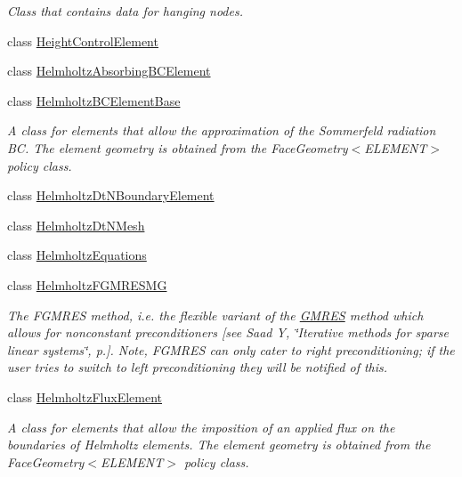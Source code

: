 \begin{DoxyCompactItemize}
\begin{DoxyCompactList}\small\item\em Class that contains data for hanging nodes. \end{DoxyCompactList}\item 
class \hyperlink{classoomph_1_1HeightControlElement}{Height\+Control\+Element}
\item 
class \hyperlink{classoomph_1_1HelmholtzAbsorbingBCElement}{Helmholtz\+Absorbing\+B\+C\+Element}
\item 
class \hyperlink{classoomph_1_1HelmholtzBCElementBase}{Helmholtz\+B\+C\+Element\+Base}
\begin{DoxyCompactList}\small\item\em A class for elements that allow the approximation of the Sommerfeld radiation BC. The element geometry is obtained from the Face\+Geometry$<$\+E\+L\+E\+M\+E\+N\+T$>$ policy class. \end{DoxyCompactList}\item 
class \hyperlink{classoomph_1_1HelmholtzDtNBoundaryElement}{Helmholtz\+Dt\+N\+Boundary\+Element}
\item 
class \hyperlink{classoomph_1_1HelmholtzDtNMesh}{Helmholtz\+Dt\+N\+Mesh}
\item 
class \hyperlink{classoomph_1_1HelmholtzEquations}{Helmholtz\+Equations}
\item 
class \hyperlink{classoomph_1_1HelmholtzFGMRESMG}{Helmholtz\+F\+G\+M\+R\+E\+S\+MG}
\begin{DoxyCompactList}\small\item\em The F\+G\+M\+R\+ES method, i.\+e. the flexible variant of the \hyperlink{classoomph_1_1GMRES}{G\+M\+R\+ES} method which allows for nonconstant preconditioners \mbox{[}see Saad Y, \char`\"{}\+Iterative methods for sparse linear systems\char`\"{}, p.\mbox{]}. Note, F\+G\+M\+R\+ES can only cater to right preconditioning; if the user tries to switch to left preconditioning they will be notified of this. \end{DoxyCompactList}\item 
class \hyperlink{classoomph_1_1HelmholtzFluxElement}{Helmholtz\+Flux\+Element}
\begin{DoxyCompactList}\small\item\em A class for elements that allow the imposition of an applied flux on the boundaries of Helmholtz elements. The element geometry is obtained from the Face\+Geometry$<$\+E\+L\+E\+M\+E\+N\+T$>$ policy class. \end{DoxyCompactList}\item 

\end{DoxyCompactItemize}
